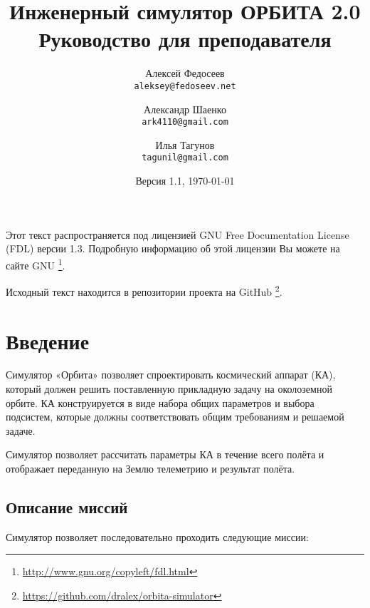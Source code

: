 \documentclass[12pt,a4paper]{article}
\begin{document}
\title{%
  \textbf{Инженерный симулятор ОРБИТА 2.0} \\
    Руководство для преподавателя}

\author{
  Алексей Федосеев\\
  \texttt{aleksey@fedoseev.net}
  \and
  Александр Шаенко\\
  \texttt{ark4110@gmail.com}
  \and
  Илья Тагунов\\
  \texttt{tagunil@gmail.com}
}

\date{Версия 1.1, \today}

\maketitle

Этот текст распространяется под лицензией GNU Free Documentation License (FDL) версии
1.3. Подробную информацию об этой лицензии Вы можете на сайте GNU
\footnote{\url{http://www.gnu.org/copyleft/fdl.html}}.

Исходный текст находится в репозитории проекта на GitHub
\footnote{\url{https://github.com/dralex/orbita-simulator}}.

\tableofcontents

\clearpage
\section{Введение}

Симулятор «Орбита» позволяет спроектировать космический аппарат (КА), который должен
решить поставленную прикладную задачу на околоземной орбите. КА конструируется в виде
набора общих параметров и выбора подсистем, которые должны соответствовать общим
требованиям и решаемой задаче.

Симулятор позволяет рассчитать параметры КА в течение всего полёта и отображает переданную
на Землю телеметрию и результат полёта.

\subsection{Описание миссий}

Симулятор позволяет последовательно проходить следующие миссии:
\end{document}
